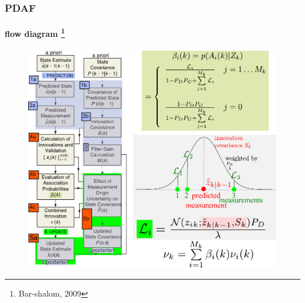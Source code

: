 \begin{frame}[plain]
\frametitle{PDAF}
\framesubtitle{flow diagram \tiny{\footnote{Bar-shalom, 2009}}}
\logoCSIPCPL\mypagenum
	\begin{changemargin}{-1.3in}{0in}
		\begin{figure}
			\includegraphics[height=0.8\textheight]{figs/TRK_PDAF_flowDiagram.pdf}
		\end{figure}	
	\end{changemargin}
\end{frame}





